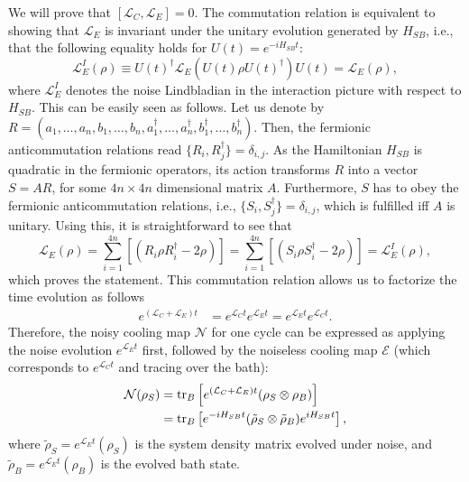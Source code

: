 We will prove that $[\mathcal{L}_C, \mathcal{L}_E] = 0$.
The commutation relation is equivalent to showing that $\mathcal{L}_E$ is invariant under the unitary evolution generated by $H_{SB}$, i.e., that the following equality holds for $U(t) = e^{-i H_{SB} t}$:
\begin{equation}
    \mathcal{L}_E^I(\rho) \equiv U(t)^\dagger \mathcal{L}_E(U(t) \rho U(t)^\dagger) U(t) = \mathcal{L}_E(\rho),\label{eq:LE_invariance_condition}
\end{equation}
where $\mathcal{L}_E^I$ denotes the noise Lindbladian in the interaction picture with respect to $H_{SB}$. This can be easily seen as follows. Let us denote by $R=(a_1,\ldots, a_n, b_1,\ldots, b_n, a_1^\dagger,\ldots, a_n^\dagger, b_1^\dagger,\ldots, b_n^\dagger)$. Then, the fermionic anticommutation relations read $\{R_i,R_j^\dagger\}=\delta_{i,j}$. As the Hamiltonian $H_{SB}$ is quadratic in the fermionic operators, its action transforms $R$ into a vector $S=A R$, for some $4n\times 4n$ dimensional matrix $A$. Furthermore, $S$ has to obey the fermionic anticommutation relations, i.e., $\{S_i,S_j^\dagger\}=\delta_{i,j}$, which is fulfilled iff $A$ is unitary. Using this, it is straightforward to see that
\begin{equation}
    \mathcal{L}_E(\rho) =\sum_{i=1}^{4n}\left[ (R_i\rho R_i^\dagger  - 2 \rho) \right]=\sum_{i=1}^{4n}\left[ (S_i\rho S_i^\dagger  - 2 \rho) \right]= \mathcal{L}_E^I(\rho), \label{eq:LE_invariance_proof}
\end{equation}
which proves the statement. This commutation relation allows us to factorize the time evolution as follows
\begin{align}
    e^{(\mathcal{L}_C + \mathcal{L}_E)t} &= e^{\mathcal{L}_C t} e^{\mathcal{L}_E t} = e^{\mathcal{L}_E t} e^{\mathcal{L}_C t}.
\end{align}
Therefore, the noisy cooling map $\mathcal{N}$ for one cycle can be expressed as applying the noise evolution $e^{\mathcal{L}_E t}$ first, followed by the noiseless cooling map $\mathcal{E}$ (which corresponds to $e^{\mathcal{L}_C t}$ and tracing over the bath):
\begin{align}
    \mathcal{N}(\rho_S)
     &= \operatorname{tr}_B\left[e^{(\mathcal{L}_C + \mathcal{L}_E)t}(\rho_S \otimes \rho_B)\right] \nonumber\\
     &= \operatorname{tr}_B\left[e^{-iH_{SB}t} (\tilde{\rho}_S \otimes \tilde{\rho}_B) e^{i H_{SB}t}\right],
\end{align}
where $\tilde{\rho}_S = e^{\mathcal{L}_E t}(\rho_S)$ is the system density matrix evolved under noise, and $\tilde{\rho}_B = e^{\mathcal{L}_E t}(\rho_B)$ is the evolved bath state.


